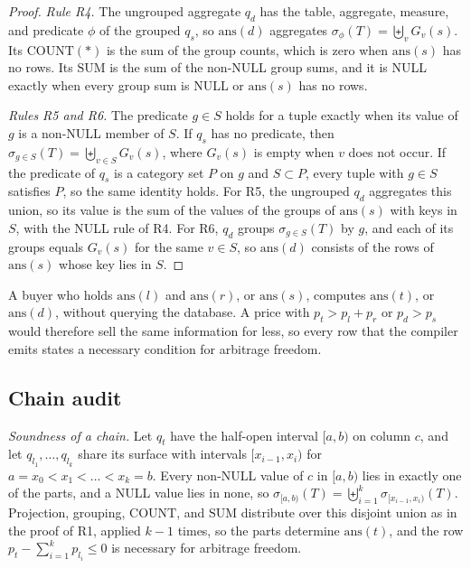 \documentclass[10pt]{article}
\newcommand{\ans}{\mathrm{ans}}
\begin{document}
\begin{proof}
\emph{Rule R4.} The ungrouped aggregate $q_d$ has the table, aggregate, measure, and predicate $\phi$ of the grouped $q_s$, so $\ans(d)$ aggregates $\sigma_\phi(T) = \biguplus_v G_v(s)$. Its $\mathrm{COUNT}(*)$ is the sum of the group counts, which is zero when $\ans(s)$ has no rows. Its $\mathrm{SUM}$ is the sum of the non-NULL group sums, and it is NULL exactly when every group sum is NULL or $\ans(s)$ has no rows.

\emph{Rules R5 and R6.} The predicate $g \in S$ holds for a tuple exactly when its value of $g$ is a non-NULL member of $S$. If $q_s$ has no predicate, then $\sigma_{g \in S}(T) = \biguplus_{v \in S} G_v(s)$, where $G_v(s)$ is empty when $v$ does not occur. If the predicate of $q_s$ is a category set $P$ on $g$ and $S \subset P$, every tuple with $g \in S$ satisfies $P$, so the same identity holds. For R5, the ungrouped $q_d$ aggregates this union, so its value is the sum of the values of the groups of $\ans(s)$ with keys in $S$, with the NULL rule of R4. For R6, $q_d$ groups $\sigma_{g \in S}(T)$ by $g$, and each of its groups equals $G_v(s)$ for the same $v \in S$, so $\ans(d)$ consists of the rows of $\ans(s)$ whose key lies in $S$.
\end{proof}

A buyer who holds $\ans(l)$ and $\ans(r)$, or $\ans(s)$, computes $\ans(t)$, or $\ans(d)$, without querying the database. A price with $p_t > p_l + p_r$ or $p_d > p_s$ would therefore sell the same information for less, so every row that the compiler emits states a necessary condition for arbitrage freedom.

\subsection{Chain audit}
\emph{Soundness of a chain.} Let $q_t$ have the half-open interval $[a, b)$ on column $c$, and let $q_{l_1},\dots,q_{l_k}$ share its surface with intervals $[x_{i-1}, x_i)$ for $a = x_0 < x_1 < \dots < x_k = b$. Every non-NULL value of $c$ in $[a, b)$ lies in exactly one of the parts, and a NULL value lies in none, so $\sigma_{[a,b)}(T) = \biguplus_{i=1}^{k} \sigma_{[x_{i-1},x_i)}(T)$. Projection, grouping, $\mathrm{COUNT}$, and $\mathrm{SUM}$ distribute over this disjoint union as in the proof of R1, applied $k - 1$ times, so the parts determine $\ans(t)$, and the row $p_t - \sum_{i=1}^{k} p_{l_i} \le 0$ is necessary for arbitrage freedom.
\end{document}
